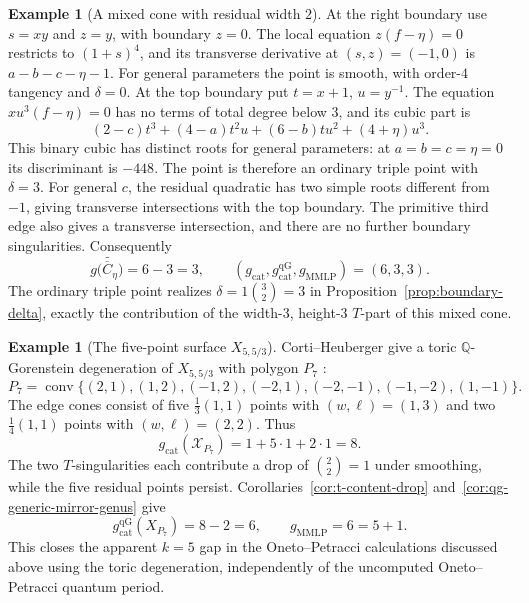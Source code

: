 \documentclass[11pt]{article}
\theoremstyle{plain}
\theoremstyle{definition}
\newtheorem{example}[theorem]{Example}
\theoremstyle{remark}
\newcommand{\Q}{\mathbb Q}
\newcommand{\1}{\mathbf 1}
\begin{document}
\begin{example}[A mixed cone with residual width $2$]
At the right boundary use $s=xy$ and $z=y$, with boundary $z=0$.  The local equation $z(f-\eta)=0$ restricts to $(1+s)^4$, and its transverse derivative at $(s,z)=(-1,0)$ is $a-b-c-\eta-1$.  For general parameters the point is smooth, with order-$4$ tangency and $\delta=0$.  At the top boundary put $t=x+1$, $u=y^{-1}$.  The equation $xu^3(f-\eta)=0$ has no terms of total degree below $3$, and its cubic part is
\[
\boxed{(2-c)t^3+(4-a)t^2u+(6-b)tu^2+(4+\eta)u^3.}
\]
This binary cubic has distinct roots for general parameters: at $a=b=c=\eta=0$ its discriminant is $-448$.  The point is therefore an ordinary triple point with $\delta=3$.  For general $c$, the residual quadratic has two simple roots different from $-1$, giving transverse intersections with the top boundary.  The primitive third edge also gives a transverse intersection, and there are no further boundary singularities.  Consequently
\[
g\bigl(\widetilde{\overline C_\eta}\bigr)=6-3=3,
\qquad
\boxed{(g_{\mathrm{cat}},g_{\mathrm{cat}}^{\mathrm{qG}},g_{\mathrm{MMLP}})=(6,3,3).}
\]
The ordinary triple point realizes $\delta=1\binom32=3$ in Proposition~\ref{prop:boundary-delta}, exactly the contribution of the width-$3$, height-$3$ $T$-part of this mixed cone.
\end{example}

\begin{example}[The five-point surface $X_{5,5/3}$]\label{ex:five-point-toric}
Corti--Heuberger give a toric $\Q$-Gorenstein degeneration of $X_{5,5/3}$ with polygon $P_7$ \cite[Section 7 and Table 4, polygon 7]{CH}:
\[
P_7=\operatorname{conv}\{(2,1),(1,2),(-1,2),(-2,1),(-2,-1),(-1,-2),(1,-1)\}.
\]
The edge cones consist of five $\frac13(1,1)$ points with $(w,\ell)=(1,3)$ and two $\frac14(1,1)$ points with $(w,\ell)=(2,2)$.  Thus
\[
g_{\mathrm{cat}}(\mathcal X_{P_7})=1+5\cdot1+2\cdot1=8.
\]
The two $T$-singularities each contribute a drop of $\binom22=1$ under smoothing, while the five residual points persist.  Corollaries~\ref{cor:t-content-drop} and~\ref{cor:qg-generic-mirror-genus} give
\[
g_{\mathrm{cat}}^{\mathrm{qG}}(X_{P_7})=8-2=6,
\qquad \boxed{g_{\mathrm{MMLP}}=6=5+1.}
\]
This closes the apparent $k=5$ gap in the Oneto--Petracci calculations discussed above using the toric degeneration, independently of the uncomputed Oneto--Petracci quantum period.
\end{example}
\end{document}

